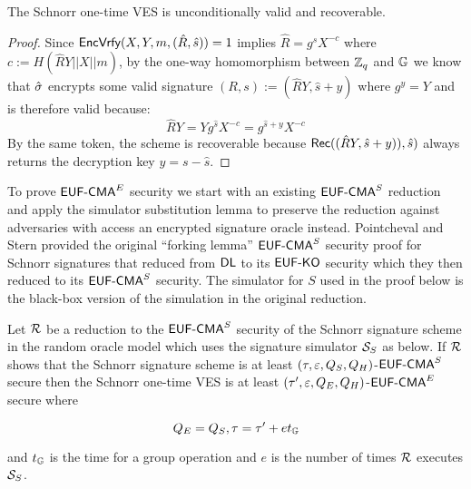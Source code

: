 \begin{lemma}
The Schnorr one-time VES is unconditionally valid and recoverable.
\end{lemma}

\begin{proof}
 Since $\textsf{EncVrfy}(X,Y,m,(\hat{R},\hat{s})) = 1$ implies $ \hat{R} = g^{\hat{s}}X^{-c}$ where $c := H(\hat{R}Y || X || m)$, by the one-way homomorphism between $\mathbb{Z}_q$ and $\mathbb{G}$ we know that $\hat{\sigma}$ encrypts some valid signature $(R,s) := (\hat{R}Y, \hat{s} + y)$ where $g^y = Y$ and is therefore valid because:
\[ \hat{R}Y = Yg^{\hat{s}}X^{-c} = g^{\hat{s} + y}X^{-c} \]
By the same token, the scheme is recoverable because $\textsf{Rec}((\hat{R}Y, \hat{s} + y)), \hat{s})$ always returns the decryption key $y = s - \hat{s}$.
\end{proof}

To prove $\textsf{EUF-CMA}^E$ security we start with an existing $\textsf{EUF-CMA}^S$ reduction and apply the simulator substitution lemma to preserve the reduction against adversaries with access an encrypted signature oracle instead.
Pointcheval and Stern\cite{pointcheval2000security} provided the original ``forking lemma'' $\textsf{EUF-CMA}^S$ security proof for Schnorr signatures that reduced from $\textsf{DL}$ to its $\textsf{EUF-KO}$ security which they then reduced to its $\textsf{EUF-CMA}^S$ security.
The simulator for $S$ used in the proof below is the black-box version of the simulation in the original reduction.

\begin{theorem}

  Let $\mathcal{R}$ be a reduction to the $\textsf{EUF-CMA}^S$ security of the Schnorr signature scheme in the random oracle model which uses the signature simulator $\mathcal{S}_S$ as below.
  If $\mathcal{R}$ shows that the Schnorr signature scheme is at least $(\tau,\varepsilon,Q_S,Q_H)$-$\textsf{EUF-CMA}^S$ secure then the Schnorr one-time VES is at least $(\tau',\varepsilon,Q_E,Q_H)$-$\textsf{EUF-CMA}^E$ secure where

  \[ Q_E = Q_S, \tau = \tau' +  et_{\mathbb{G}} \]

  \hfill \break and $t_{\mathbb{G}}$ is the time for a group operation and $e$ is the number of times $\mathcal{R}$ executes $\mathcal{S}_S$.
\end{theorem}


